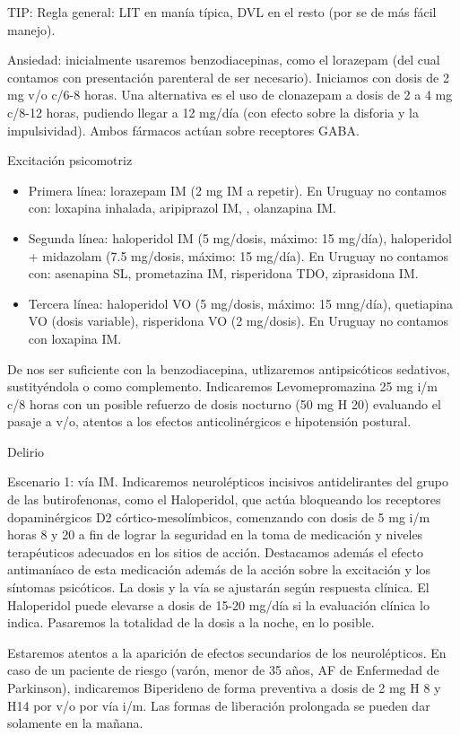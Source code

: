 \documentclass{scrbook}
\begin{document}
TIP: Regla general: LIT en manía típica, DVL en el resto (por se de más fácil manejo).

\faMedkit Ansiedad: inicialmente usaremos benzodiacepinas, como el lorazepam (del cual contamos con presentación parenteral de ser necesario). Iniciamos con dosis de 2 mg v/o c/6-8 horas. Una alternativa es el uso de clonazepam a dosis de 2 a 4 mg c/8-12 horas, pudiendo llegar a 12 mg/día (con efecto sobre la disforia y la impulsividad). Ambos fármacos actúan sobre receptores GABA.

\faMedkit Excitación psicomotriz
\begin{itemize}
	\item Primera línea: lorazepam IM (2 mg IM a repetir). En Uruguay no contamos con: loxapina inhalada, aripiprazol IM, , olanzapina IM.
	\item Segunda línea: haloperidol IM (5 mg/dosis, máximo: 15 mg/día), haloperidol + midazolam  (7.5 mg/dosis, máximo: 15 mg/día). En Uruguay no contamos con: asenapina SL, prometazina IM, risperidona TDO, ziprasidona IM.
	\item Tercera línea: haloperidol VO (5 mg/dosis, máximo: 15 mng/día), quetiapina VO (dosis variable), risperidona VO (2 mg/dosis). En Uruguay no contamos con loxapina IM.
\end{itemize}
De nos ser suficiente con la benzodiacepina, utlizaremos antipsicóticos sedativos, sustityéndola o como complemento. Indicaremos Levomepromazina 25 mg i/m c/8 horas con un posible refuerzo de dosis nocturno (50 mg H 20) evaluando el pasaje a v/o, atentos a los efectos anticolinérgicos e hipotensión postural.

\faMedkit Delirio

Escenario 1: vía IM.
Indicaremos neurolépticos incisivos antidelirantes del grupo de las butirofenonas, como el Haloperidol, que actúa bloqueando los receptores dopaminérgicos D2 córtico-mesolímbicos, comenzando con dosis de 5 mg i/m horas 8 y 20 a fin de lograr la seguridad en la toma de medicación y niveles terapéuticos adecuados en los sitios de acción. Destacamos además el efecto antimaníaco de esta medicación además de la acción sobre la excitación y los síntomas psicóticos. La dosis y la vía se ajustarán según respuesta clínica. El Haloperidol puede elevarse a dosis de 15-20 mg/día si la evaluación clínica lo indica. Pasaremos la totalidad de la dosis a la noche, en lo posible.

Estaremos atentos a la aparición de efectos secundarios de los neurolépticos. En caso de un paciente de riesgo (varón, menor de 35 años, AF de Enfermedad de Parkinson), indicaremos Biperideno de forma preventiva a dosis de 2 mg H 8 y H14 por v/o por vía i/m. Las formas de liberación prolongada se pueden dar solamente en la mañana.
\end{document}
